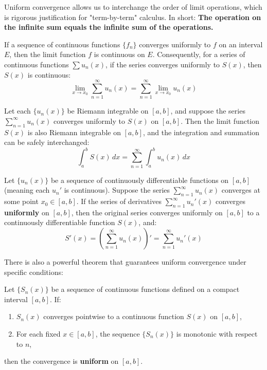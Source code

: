 Uniform convergence allows us to interchange the order of limit operations, which is rigorous justification for "term-by-term" calculus. In short: \textbf{The operation on the infinite sum equals the infinite sum of the operations.}

\begin{theorem}[Continuity]
If a sequence of continuous functions $\{f_n\}$ converges uniformly to $f$ on an interval $E$, then the limit function $f$ is continuous on $E$.
Consequently, for a series of continuous functions $\sum u_n(x)$, if the series converges uniformly to $S(x)$, then $S(x)$ is continuous:
\[ \lim_{x \to x_0} \sum_{n=1}^{\infty} u_n(x) = \sum_{n=1}^{\infty} \lim_{x \to x_0} u_n(x) \]
\end{theorem}


\begin{theorem}
Let each $\{u_n(x)\}$ be Riemann integrable on $[a, b]$, and suppose the series $\sum_{n=1}^{\infty} u_n(x)$ converges uniformly to $S(x)$ on $[a, b]$. Then the limit function $S(x)$ is also Riemann integrable on $[a, b]$, and the integration and summation can be safely interchanged:
\[ \int_a^b S(x) \, dx = \sum_{n=1}^{\infty} \int_a^b u_n(x) \, dx \]
\end{theorem}

\begin{theorem}
Let $\{u_n(x)\}$ be a sequence of continuously differentiable functions on $[a, b]$ (meaning each $u_n'$ is continuous). Suppose the series $\sum_{n=1}^{\infty} u_n(x)$ converges at some point $x_0 \in [a, b]$. If the series of derivatives $\sum_{n=1}^{\infty} u_n'(x)$ converges \textbf{uniformly} on $[a, b]$, then the original series converges uniformly on $[a, b]$ to a continuously differentiable function $S(x)$, and:
\[ S'(x) = \left( \sum_{n=1}^{\infty} u_n(x) \right)' = \sum_{n=1}^{\infty} u_n'(x) \]
\end{theorem}

There is also a powerful theorem that guarantees uniform convergence under specific conditions:

\begin{theorem}
Let $\{S_n(x)\}$ be a sequence of continuous functions defined on a compact interval $[a, b]$. If:
\begin{enumerate}
    \item $S_n(x)$ converges pointwise to a continuous function $S(x)$ on $[a, b]$,
    \item For each fixed $x \in [a, b]$, the sequence $\{S_n(x)\}$ is monotonic with respect to $n$,
\end{enumerate}
then the convergence is \textbf{uniform} on $[a, b]$.
\end{theorem}

